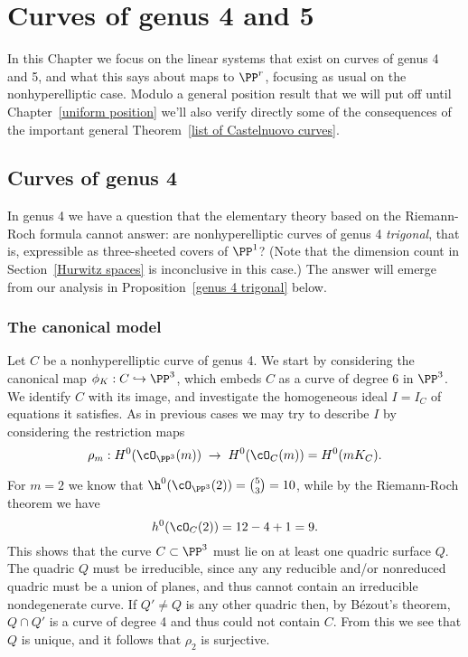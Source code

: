

\chapter{Curves of genus 4 and 5}\label{genus 4, 5 Chapter}

In this Chapter we focus on the linear systems that exist on curves of genus 4 and 5, and what this says about maps to $\PP^r$, focusing as usual on the nonhyperelliptic case. Modulo a general position result that we will put off until Chapter~\ref{uniform position} we'll also verify directly some of the consequences of the 
important  general Theorem~\ref{list of Castelnuovo curves}.



\section{Curves of genus 4}

In genus 4 we have a question that the elementary theory based on the Riemann-Roch formula cannot answer: are nonhyperelliptic curves of genus 4 \emph{trigonal}, that is, expressible as three-sheeted covers of $\PP^1$? (Note that the dimension count in Section~\ref{Hurwitz spaces} is inconclusive in this case.)
The answer will emerge from our analysis in Proposition~\ref{genus 4 trigonal} below.

\subsection{The canonical model}\label{canonical genus 4}

Let $C$ be a nonhyperelliptic curve of genus 4. We start by considering the canonical map $\phi_K : C \hookrightarrow \PP^3$, which embeds $C$ as a curve of degree 6 in $\PP^3$. We identify $C$ with its image, and investigate the homogeneous ideal $I = I_C$ of equations it satisfies. As in previous cases we may try to describe $I$ by considering the restriction maps
$$
\rho_m : H^0(\cO_{\PP^3}(m)) \; \to \; H^0(\cO_{C}(m)) = H^0(mK_C).
$$

For $m=2$ we know that $\h^0(\cO_{\PP^3}(2)) = \binom{5}{3} = 10$, while by the Riemann-Roch
theorem we have
$$
h^0(\cO_C(2)) = 12 - 4 + 1 = 9.
$$
This shows that the curve $C \subset \PP^3$ must lie on at least one quadric surface $Q$. The quadric $Q$ must be irreducible, since any any reducible and/or nonreduced quadric must be a union of planes, and thus cannot contain an irreducible nondegenerate curve.
If $Q'\neq Q$ is any other quadric then, by B\'ezout's theorem, $Q\cap Q'$ is a curve of degree 4 and thus could not contain $C$. From this we see that $Q$ is unique, and it follows that $\rho_2$ is surjective.


